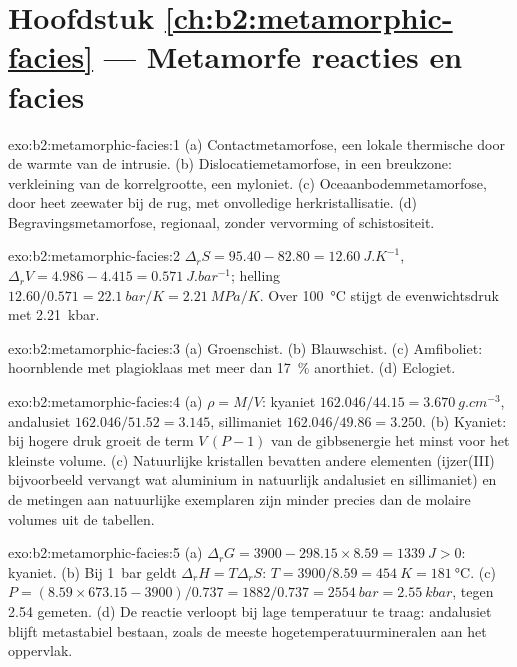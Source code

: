 \section*{Hoofdstuk \ref{ch:b2:metamorphic-facies} --- Metamorfe reacties en facies}

\begin{solution}{exo:b2:metamorphic-facies:1}
(a) Contactmetamorfose, een lokale thermische  door de warmte van de intrusie.
(b) Dislocatiemetamorfose, in een breukzone: verkleining van de korrelgrootte, een myloniet.
(c) Oceaanbodemmetamorfose, door heet zeewater bij de rug, met onvolledige
herkristallisatie. (d) Begravingsmetamorfose, regionaal, zonder vervorming of
schistositeit.
\end{solution}

\begin{solution}{exo:b2:metamorphic-facies:2}
$\Delta_r S = 95.40 - 82.80 = \qty{12.60}{J.K^{-1}}$, $\Delta_r V = 4.986 - 4.415 =
\qty{0.571}{J.bar^{-1}}$; helling $12.60/0.571 = \qty{22.1}{bar/K} = \qty{2.21}{MPa/K}$.
Over \qty{100}{\celsius} stijgt de evenwichtsdruk met \qty{2.21}{kbar}.
\end{solution}

\begin{solution}{exo:b2:metamorphic-facies:3}
(a) Groenschist. (b) Blauwschist. (c) Amfiboliet: hoornblende met plagioklaas met meer
dan \qty{17}{\percent} anorthiet. (d) Eclogiet.
\end{solution}

\begin{solution}{exo:b2:metamorphic-facies:4}
(a) $\rho = M/V$: kyaniet $162.046/44.15 = \qty{3.670}{g.cm^{-3}}$, andalusiet
$162.046/51.52 = 3.145$, sillimaniet $162.046/49.86 = 3.250$. (b) Kyaniet: bij hogere
druk groeit de term $V\,(P - 1)$ van de gibbsenergie het minst voor het kleinste volume.
(c) Natuurlijke kristallen bevatten andere elementen (ijzer(III) bijvoorbeeld vervangt wat
aluminium in natuurlijk andalusiet en sillimaniet) en de metingen aan natuurlijke
exemplaren zijn minder precies dan de molaire volumes uit de tabellen.
\end{solution}

\begin{solution}{exo:b2:metamorphic-facies:5}
(a) $\Delta_r G = 3900 - 298.15\times8.59 = \qty{+1339}{J} > 0$: kyaniet. (b) Bij
\qty{1}{bar} geldt $\Delta_r H = T\Delta_r S$: $T = 3900/8.59 = \qty{454}{K} =
\qty{181}{\celsius}$. (c) $P = (8.59\times673.15 - 3900)/0.737 = 1882/0.737 =
\qty{2554}{bar} = \qty{2.55}{kbar}$, tegen 2.54 gemeten. (d) De reactie verloopt bij lage
temperatuur te traag: andalusiet blijft metastabiel bestaan, zoals de meeste
hogetemperatuurmineralen aan het oppervlak.
\end{solution}

